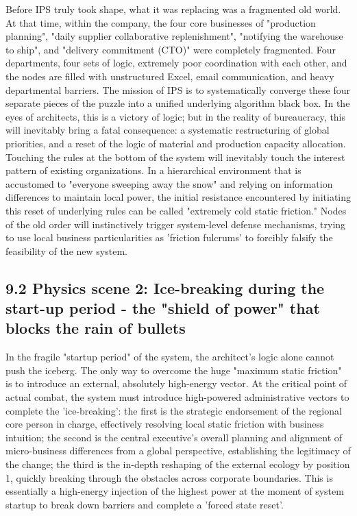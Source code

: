 \documentclass[11pt,a4paper]{article}
\begin{document}
Before IPS truly took shape, what it was replacing was a fragmented old world. At that time, within the company, the four core businesses of "production planning", "daily supplier collaborative replenishment", "notifying the warehouse to ship", and "delivery commitment (CTO)" were completely fragmented. Four departments, four sets of logic, extremely poor coordination with each other, and the nodes are filled with unstructured Excel, email communication, and heavy departmental barriers. The mission of IPS is to systematically converge these four separate pieces of the puzzle into a unified underlying algorithm black box. In the eyes of architects, this is a victory of logic; but in the reality of bureaucracy, this will inevitably bring a fatal consequence: a systematic restructuring of global priorities, and a reset of the logic of material and production capacity allocation. Touching the rules at the bottom of the system will inevitably touch the interest pattern of existing organizations. In a hierarchical environment that is accustomed to "everyone sweeping away the snow" and relying on information differences to maintain local power, the initial resistance encountered by initiating this reset of underlying rules can be called "extremely cold static friction." Nodes of the old order will instinctively trigger system-level defense mechanisms, trying to use local business particularities as 'friction fulcrums' to forcibly falsify the feasibility of the new system.


\subsection*{9.2 Physics scene 2: Ice-breaking during the start-up period - the "shield of power" that blocks the rain of bullets}


In the fragile "startup period" of the system, the architect's logic alone cannot push the iceberg. The only way to overcome the huge "maximum static friction" is to introduce an external, absolutely high-energy vector. At the critical point of actual combat, the system must introduce high-powered administrative vectors to complete the 'ice-breaking': the first is the strategic endorsement of the regional core person in charge, effectively resolving local static friction with business intuition; the second is the central executive's overall planning and alignment of micro-business differences from a global perspective, establishing the legitimacy of the change; the third is the in-depth reshaping of the external ecology by position 1, quickly breaking through the obstacles across corporate boundaries. This is essentially a high-energy injection of the highest power at the moment of system startup to break down barriers and complete a 'forced state reset'.
\end{document}
